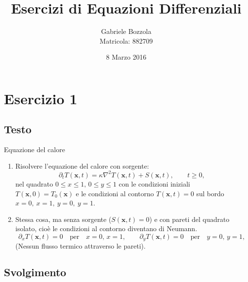 \documentclass[]{scrartcl}
\title{Esercizi di Equazioni Differenziali}
\author{Gabriele Bozzola \\ Matricola: 882709}
\date{8 Marzo 2016}
\newcommand{\px}{\partial_x}
\newcommand{\py}{\partial_y}
\newcommand{\pt}{\partial_t}
\newcommand{\xvt}{(\mathbf{x},t)}
\newcommand{\lap}{\nabla^2}
\begin{document}
\maketitle


\section*{Esercizio 1}

\subsection*{Testo} Equazione del calore

\begin{enumerate}
	\item Risolvere l'equazione del calore con sorgente:
	\begin{equation}
	\pt T\xvt = \kappa \lap T \xvt + S \xvt, \qquad t \geq 0,
	\label{eq:calore}
	\end{equation}
	nel quadrato $ 0 \leq x \leq 1 ,\, 0 \leq y \leq 1 $ con le condizioni iniziali $ T(\mathbf{x},0) = T_0(\mathbf{x}) $ e le condizioni al contorno $ T\xvt = 0 $ sul bordo $ x=0,~x=1,~y=0,~y=1 $.
	\item Stessa cosa, ma senza sorgente ($ S\xvt = 0 $) e con pareti del quadrato isolato, cioè le condizioni al contorno diventano di Neumann.
	\[	\px T\xvt = 0 \quad \text{per} \quad x = 0,\,x=1, \qquad \py T\xvt = 0 \quad \text{per} \quad y = 0,\,y=1,	\]
	(Nessun flusso termico attraverso le pareti).
\end{enumerate}

\subsection*{Svolgimento} 
\end{document}
